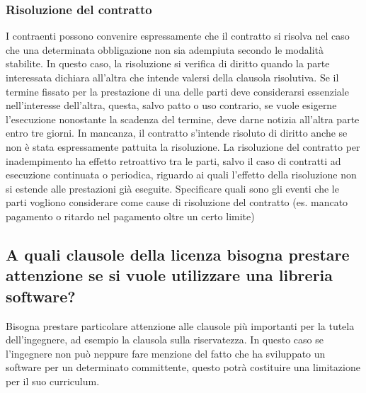 \subsubsection{Risoluzione del contratto}
I contraenti possono convenire espressamente che il contratto si risolva nel caso che una determinata obbligazione non sia adempiuta secondo le modalità stabilite.
In questo caso, la risoluzione si verifica di diritto quando la parte interessata dichiara all'altra che intende valersi della clausola risolutiva.
Se il termine fissato per la prestazione di una delle parti deve considerarsi essenziale nell'interesse dell'altra, questa, salvo patto o uso contrario,
se vuole esigerne l'esecuzione nonostante la scadenza del termine, deve darne notizia all'altra parte entro tre giorni. In mancanza, il contratto s'intende
risoluto di diritto anche se non è stata espressamente pattuita la risoluzione.\newline
La risoluzione del contratto per inadempimento ha effetto retroattivo tra le parti, salvo il caso di contratti ad esecuzione continuata o periodica,
riguardo ai quali l'effetto della risoluzione non si estende alle prestazioni già eseguite.\newline
Specificare quali sono gli eventi che le parti vogliono considerare come cause di risoluzione del contratto (es. mancato pagamento o ritardo nel pagamento oltre un certo limite)

\subsection{A quali clausole della licenza bisogna prestare attenzione se si vuole utilizzare una libreria software?}
Bisogna prestare particolare attenzione alle clausole più importanti per la tutela dell'ingegnere, ad esempio la clausola sulla riservatezza. In questo caso se
l'ingegnere non può neppure fare menzione del fatto che ha sviluppato un software per un determinato committente, questo potrà costituire una
limitazione per il suo curriculum.

